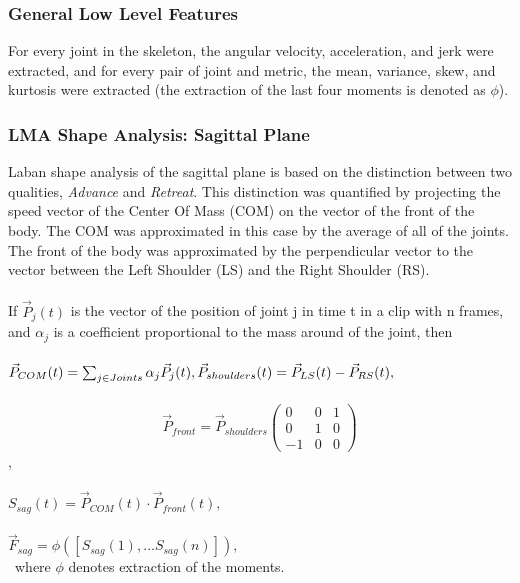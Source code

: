 \documentclass[11pt,twocolumn,varwidth=true,a4paper,fleqn]{article}
\begin{document}
\subsubsection{General Low Level Features}
For every joint in the skeleton, the angular velocity, acceleration, and jerk
were extracted, and for every pair of joint and metric, the mean, variance,
skew, and kurtosis were extracted (the extraction of the last four moments
is denoted as $\phi$).
\subsubsection{LMA Shape Analysis: Sagittal Plane}
Laban shape analysis of the sagittal plane is based on the distinction
between two qualities, \textit{Advance} and \textit{Retreat}. This distinction was quantified by projecting the 
speed vector of the Center Of Mass (COM) on the vector of the front of the body. 
The COM was approximated in this case by the average of all of the joints. 
The front of the body was approximated by the perpendicular vector to the vector 
between the Left Shoulder (LS) and
the Right Shoulder (RS).
\\\\If $\vec{P}_{j}(t)$ is the vector of the position of joint j in time t in
a clip with n frames, and $ \alpha_{j}$ is a coefficient proportional to the
mass around of the joint, then
\\
\\$\vec{P}_{COM}(t) = \sum_{j \in Joints} \alpha_{j}\vec{P}_{j}(t),
\\
\\\vec{P}_{shoulders}(t)=\vec{P}_{LS}(t)-\vec{P}_{RS}(t),$
\\
\\\[ \vec{P}_{front}=\vec{P}_{shoulders}\left( \begin{array}{ccc}
0 & 0 & 1 \\
0 & 1 & 0 \\
-1 & 0 & 0 \end{array} \right)\],
\\
\\
$S_{sag}(t) = \vec{P}_{COM}(t)\cdot\vec{P}_{front}(t),$
\\
\\
$\vec{F}_{sag} = \phi([S_{sag}(1), \ldots S_{sag}(n)]),$
\\\
where $\phi$ denotes extraction of the moments.
\end{document}
